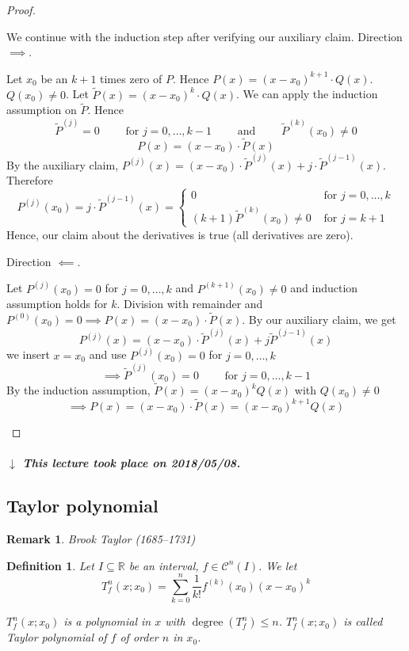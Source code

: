 \documentclass{article}
\newtheorem{definition}{Definition}  \numberwithin{definition}{section}
\newtheorem{remark}{Remark}  \numberwithin{remark}{section}
\newcommand{\dateref}[1]{%
  \begin{mdframed}[backgroundcolor=gray!10,innerbottommargin=0pt,innertopmargin=0pt]
    \paragraph{\textit{$\downarrow$ This lecture took place on #1.}}%
  \end{mdframed}%
}
\begin{document}
\begin{proof}
\begin{description}
      We continue with the induction step after verifying our auxiliary claim. Direction $\implies$.

      Let $x_0$ be an $k+1$ times zero of $P$. Hence $P(x) = (x - x_0)^{k+1} \cdot Q(x)$. $Q(x_0) \neq 0$.
      Let $\tilde P(x) = (x - x_0)^k \cdot Q(x)$. 
      We can apply the induction assumption on $\tilde P$. Hence
      \[ \tilde P^{(j)} = 0 \qquad \text{ for } j = 0, \ldots, k-1 \qquad \text{ and } \qquad \tilde P^{(k)}(x_0) \neq 0 \]
      \[ P(x) = (x - x_0) \cdot \tilde P(x) \]
      By the auxiliary claim, $P^{(j)}(x) = (x - x_0) \cdot \tilde P^{(j)}(x) + j \cdot \tilde P^{(j-1)}(x)$.
      Therefore
      \[
        P^{(j)}(x_0) = j \cdot \tilde P^{(j-1)}(x) = \begin{cases}
          0 & \text{ for } j = 0, \dots, k \\
          (k+1)\tilde P^{(k)}(x_0) \neq 0 & \text{ for } j = k+1
        \end{cases}
      \]
      Hence, our claim about the derivatives is true (all derivatives are zero).

      Direction $\impliedby$.

      Let $P^{(j)}(x_0) = 0$ for $j = 0, \dots, k$ and $P^{(k+1)}(x_0) \neq 0$ and induction assumption holds for $k$.
      Division with remainder and $P^{(0)}(x_0) = 0 \implies P(x) = (x - x_0) \cdot \tilde P(x)$.
      By our auxiliary claim, we get
      \[ P^{(j)}(x) = (x - x_0) \cdot \tilde P^{(j)}(x) + j \tilde P^{(j-1)}(x) \]
      we insert $x = x_0$ and use $P^{(j)}(x_0) = 0$ for $j = 0, \dots, k$
      \[ \implies \tilde P^{(j)}(x_0) = 0 \qquad \text{ for } j = 0, \dots, k-1 \]
      By the induction assumption, $\tilde P(x) = (x - x_0)^k Q(x)$ with $Q(x_0) \neq 0$
      \[ \implies P(x) = (x - x_0) \cdot \tilde P(x) = (x - x_0)^{k+1} Q(x) \]
  \end{description}
\end{proof}

\dateref{2018/05/08}

\subsection{Taylor polynomial}

\begin{remark}
  Brook Taylor (1685--1731)
\end{remark}

\begin{definition} %
  \label{def3}
  Let $I \subseteq \mathbb R$ be an interval, $f \in \mathcal C^n(I)$.
  We let
  \[ T_f^n(x; x_0) = \sum_{k=0}^n \frac{1}{k!} f^{(k)}(x_0) (x - x_0)^k \]

  $T_f^n(x; x_0)$ is a polynomial in $x$ with $\operatorname{degree}(T_f^n) \leq n$.
  $T_f^n(x; x_0)$ is called \emph{Taylor polynomial of $f$ of order $n$ in $x_0$}.
\end{definition}
\end{document}
